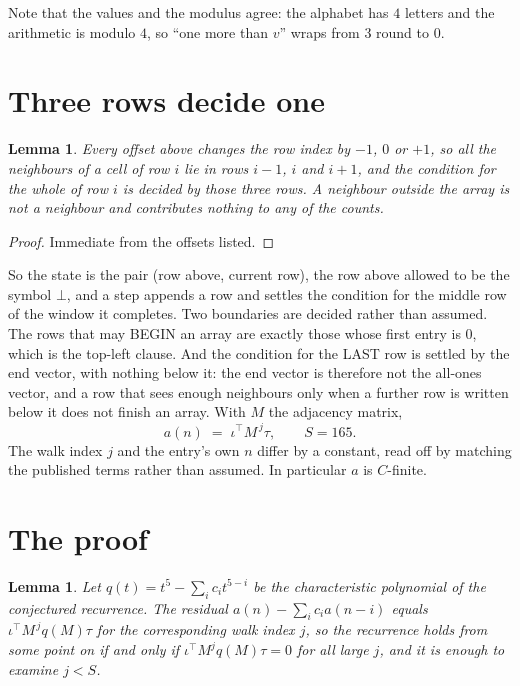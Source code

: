 \documentclass[11pt,a4paper]{article}
\theoremstyle{plain}
\newtheorem{lemma}[theorem]{Lemma}
\theoremstyle{definition}
\begin{document}
Note that the values and the modulus agree: the alphabet has $4$ letters and the arithmetic
is modulo $4$, so ``one more than $v$'' wraps from $3$ round to $0$.

\section{Three rows decide one}

\begin{lemma}\label{lem:win}
Every offset above changes the row index by $-1$, $0$ or $+1$, so all the neighbours of a cell
of row $i$ lie in rows $i-1$, $i$ and $i+1$, and the condition for the whole of row $i$ is
decided by those three rows. A neighbour outside the array is not a neighbour and contributes
nothing to any of the counts.
\end{lemma}

\begin{proof}
Immediate from the offsets listed.
\end{proof}

So the state is the pair (row above, current row), the row above allowed to be the symbol
$\bot$, and a step appends a row and settles the condition for the middle row of the window it
completes. Two boundaries are decided rather than assumed. The rows that may BEGIN an array are
exactly those whose first entry is $0$, which is the top-left clause. And the condition for the
LAST row is settled by the end vector, with nothing below it: the end vector is therefore not
the all-ones vector, and a row that sees enough neighbours only when a further row is written
below it does not finish an array. With $M$ the adjacency matrix,
\[
a(n)\;=\;\iota^{\!\top}M^{\,j}\tau ,\qquad S=165.
\]
The walk index $j$ and the entry's own $n$ differ by a constant, read off by matching the
published terms rather than assumed. In particular $a$ is $C$-finite.

\section{The proof}

\begin{lemma}\label{lem:crit}
Let $q(t)=t^{5}-\sum_i c_it^{5-i}$ be the characteristic polynomial of the
conjectured recurrence. The residual $a(n)-\sum_ic_ia(n-i)$ equals
$\iota^{\!\top}M^{\,j}q(M)\tau$ for the corresponding walk index $j$, so the recurrence
holds from some point on if and only if $\iota^{\!\top}M^{j}q(M)\tau=0$ for all large $j$,
and it is enough to examine $j<S$.
\end{lemma}
\end{document}
